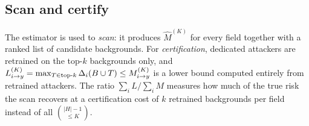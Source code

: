 \subsection{Scan and certify}\label{sec:scan}
The estimator is used to \emph{scan}: it produces $\hat M^{(K)}$ for every field together with a
ranked list of candidate backgrounds. For \emph{certification},
dedicated attackers are retrained on the top-$k$ backgrounds only, and
$L^{(K)}_{i\to y}=\max_{T\in\text{top-}k}\Delta_i(B\cup T)\le M^{(K)}_{i\to y}$ is a lower bound computed
entirely from retrained attackers. The ratio $\sum_i L/\sum_i M$ measures how much of the true
risk the scan recovers at a certification cost of $k$ retrained backgrounds per field instead
of all $\binom{|H|-1}{\le K}$.
